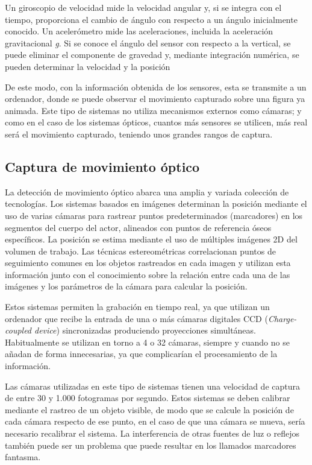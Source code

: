 Un giroscopio de velocidad mide la velocidad angular y, si se integra con el tiempo, proporciona el cambio de ángulo con respecto a un ángulo inicialmente conocido. Un acelerómetro mide las aceleraciones, incluida la aceleración gravitacional \textit{g}. Si se conoce el ángulo del sensor con respecto a la vertical, se puede eliminar el componente de gravedad y, mediante integración numérica, se pueden determinar la velocidad y la posición

De este modo, con la información obtenida de los sensores, esta se transmite a un ordenador, donde se puede observar el movimiento capturado sobre una figura ya animada. Este tipo de sistemas no utiliza mecanismos externos como cámaras; y como en el caso de los sistemas ópticos, cuantos más sensores se utilicen, más real será el movimiento capturado, teniendo unos grandes rangos de captura. 


\subsection{Captura de movimiento óptico}

La detección de movimiento óptico abarca una amplia y variada colección de tecnologías. Los sistemas basados en imágenes determinan la posición mediante el uso de varias cámaras para rastrear puntos predeterminados (marcadores) en los segmentos del cuerpo del actor, alineados con puntos de referencia óseos específicos. La posición se estima mediante el uso de múltiples imágenes 2D del volumen de trabajo. Las técnicas estereométricas correlacionan puntos de seguimiento comunes en los objetos rastreados en cada imagen y utilizan esta información junto con el conocimiento sobre la relación entre cada una de las imágenes y los parámetros de la cámara para calcular la posición.

Estos sistemas permiten la grabación en tiempo real, ya que utilizan un ordenador que recibe la entrada de una o más cámaras digitales CCD (\textit{Charge-coupled device}) sincronizadas produciendo proyecciones simultáneas. Habitualmente se utilizan en torno a 4 o 32 cámaras, siempre y cuando no se añadan de forma innecesarias, ya que complicarían el procesamiento de la información.

Las cámaras utilizadas en este tipo de sistemas tienen una velocidad de captura de entre 30 y 1.000 fotogramas por segundo. Estos sistemas se deben calibrar mediante el rastreo de un objeto visible, de modo que se calcule la posición de cada cámara respecto de ese punto, en el caso de que una cámara se mueva, sería necesario recalibrar el sistema. La interferencia de otras fuentes de luz o reflejos también puede ser un problema que puede resultar en los llamados marcadores fantasma.

